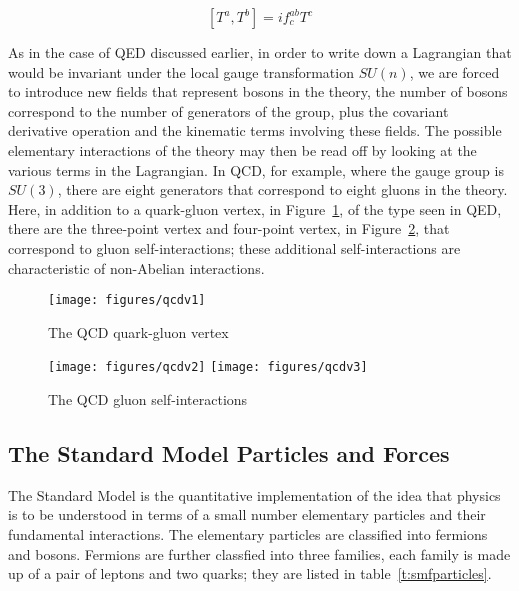 $$[T^a, T^b] = if^{ab}_cT^c $$

As in the case of QED discussed earlier, in order to write down a Lagrangian
that would be invariant under the local gauge transformation $SU(n)$, we are
forced to introduce new fields that represent bosons in the theory, the number
of bosons correspond to the number of generators of the group, plus the
covariant derivative operation and the kinematic terms involving these fields.
The possible elementary interactions of the theory may then be read off by
looking at the various terms in the Lagrangian. In QCD, for example, where the
gauge group is $SU(3)$, there are eight generators that correspond to eight
gluons in the theory. Here, in addition to a quark-gluon vertex, in
Figure~\ref{f:qcdv1}, of the type seen in QED, there are the three-point vertex
and four-point vertex, in Figure~\ref{f:qcdv23}, that correspond to gluon
self-interactions; these additional self-interactions are characteristic of
non-Abelian interactions.

\begin{figure}[H]
	\texttt{[image: figures/qcdv1]}
	\centering
	\caption{The QCD quark-gluon vertex}
	\label{f:qcdv1}
\end{figure}

\begin{figure}[H]
	\texttt{[image: figures/qcdv2]}
	\texttt{[image: figures/qcdv3]}
	\centering
	\caption{The QCD gluon self-interactions}
	\label{f:qcdv23}
\end{figure}


\subsection{The Standard Model Particles and Forces}\label{s:smpf}

The Standard Model is the quantitative implementation of the idea that physics
is to be understood in terms of a small number elementary particles and their
fundamental interactions. The elementary particles are classified into fermions
and bosons. Fermions are further classfied into three families, each family is
made up of a pair of leptons and two quarks; they are listed in
table~\ref{t:smfparticles}.


